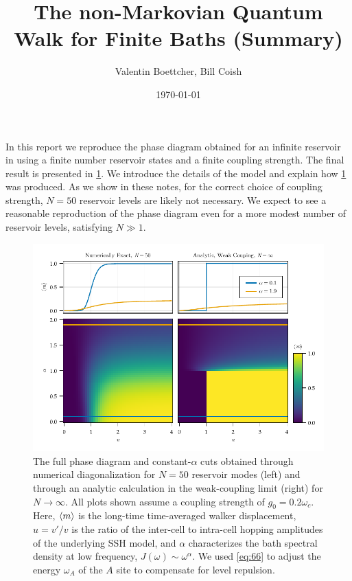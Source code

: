 \documentclass[fontsize=10pt,paper=b5,open=any,
twoside=no,toc=listof,toc=bibliography,headings=optiontohead,
captions=nooneline,captions=tableabove,english,DIV=15,numbers=noenddot,final,parskip=yes,
headinclude=true,footinclude=false,BCOR=0mm]{scrartcl}
\author{Valentin Boettcher, Bill Coish}
\title{The non-Markovian Quantum Walk for Finite Baths (Summary)}
\date{\today}
\begin{document}
\maketitle
In this report we reproduce the phase diagram obtained for an infinite
reservoir in  using a finite number reservoir
states and a finite coupling strength. The final result is presented
in \cref{fig:example_finite_vs_continuum}. We introduce the details of
the model and explain how \cref{fig:example_finite_vs_continuum} was
produced. As we show in these notes, for the correct choice of
coupling strength, \(N=50\) reservoir levels are likely not
necessary. We expect to see a reasonable reproduction of the phase
diagram even for a more modest number of reservoir levels, satisfying
\(N\gg 1\).

\begin{figure}[H]
  \centering
  \includegraphics{plots/example_finite_vs_continuum}
  \caption{\label{fig:example_finite_vs_continuum} The full phase
    diagram and constant-\(α\) cuts obtained through numerical
    diagonalization for \(N=50\) reservoir modes (left) and through an
    analytic calculation in the weak-coupling limit (right) for
    \(N\to ∞\). All plots shown assume a coupling strength of
    \(g_{0}=0.2 ω_{c}\). Here, \(\ev{m}\) is the long-time
    time-averaged walker displacement, \(u=v\prime/v\) is the ratio of
    the inter-cell to intra-cell hopping amplitudes of the underlying
    SSH model, and \(α\) characterizes the bath spectral density at
    low frequency, \(J(ω)\sim ω^{α}\). We used \cref{eq:66} to adjust
    the energy \(ω_{A}\) of the \(A\) site to compensate for level
    repulsion.}
\end{figure}
\end{document}
